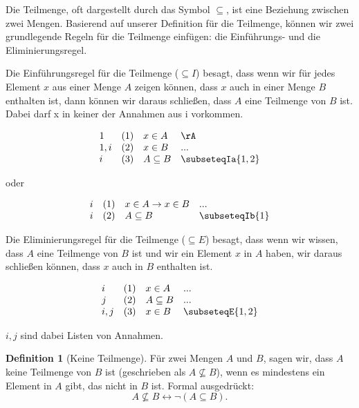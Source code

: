 \documentclass{book}
\theoremstyle{plain}
\theoremstyle{remark}
\theoremstyle{definition}
\newtheorem{definition}{Definition}[section]
\begin{document}
Die Teilmenge, oft dargestellt durch das Symbol \(\subseteq\), ist eine Beziehung zwischen zwei Mengen. Basierend auf unserer Definition für die Teilmenge, können wir zwei grundlegende Regeln für die Teilmenge einfügen: die Einführungs- und die Eliminierungsregel.

Die Einführungsregel für die Teilmenge (\(\subseteq I\)) besagt, dass wenn wir für jedes Element \(x\) aus einer Menge \(A\) zeigen können, dass \(x\) auch in einer Menge \(B\) enthalten ist, dann können wir daraus schließen, dass \(A\) eine Teilmenge von \(B\) ist. Dabei darf x in keiner der Annahmen aus i vorkommen.

\[
\begin{array}{llll}
	1   & (1) & x \in A & \rA \\
	1,i & (2) & x \in B & ... \\
	i   & (3) & A \subseteq B & \subseteqIa{1,2} \\
\end{array}
\]

oder

\[
\begin{array}{llll}
	i & (1) & x\in A\rightarrow x \in B & ... \\
	i & (2) & A \subseteq B & \subseteqIb{1} \\
\end{array}
\]

Die Eliminierungsregel für die Teilmenge (\(\subseteq E\)) besagt, dass wenn wir wissen, dass \(A\) eine Teilmenge von \(B\) ist und wir ein Element \(x\) in \(A\) haben, wir daraus schließen können, dass \(x\) auch in \(B\) enthalten ist.

\[
\begin{array}{llll}
	i & (1) & x \in A & ... \\
	j & (2) & A \subseteq B & ... \\
	i,j & (3) & x \in B & \subseteqE{1,2} \\
\end{array}
\]

\(i,j\) sind dabei Listen von Annahmen.


\begin{definition}[Keine Teilmenge]
	Für zwei Mengen \(A\) und \(B\), sagen wir, dass \(A\) keine Teilmenge von \(B\) ist (geschrieben als \(A \nsubseteq B\)), wenn es mindestens ein Element in \(A\) gibt, das nicht in \(B\) ist. Formal ausgedrückt:
	\[
	A \nsubseteq B \leftrightarrow \neg(A\subseteq B).
	\]
\end{definition}
\end{document}
